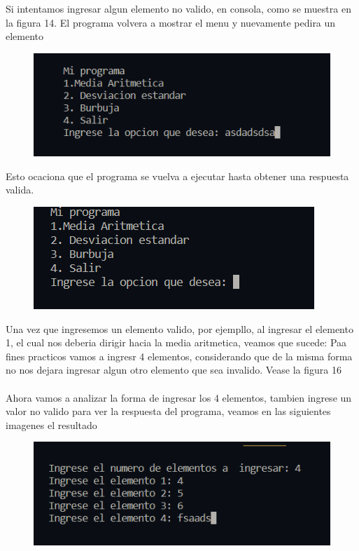 \documentclass[12pt]{article}
\begin{document}
Si intentamos ingresar algun elemento no valido, en consola, como se muestra en la figura 14. El programa volvera a mostrar el menu y  nuevamente pedira un elemento
	\begin{figure}[H]
		\begin{center}
 			\includegraphics[width = .6\textwidth]{ingresa_val_erroneo.png}
		\end{center} 
	\end{figure}
	Esto ocaciona que el programa se vuelva a ejecutar hasta obtener una respuesta valida. 
	\begin{figure}[H]
		\begin{center}
 			\includegraphics[width = .6\textwidth]{menu.png}
		\end{center} 
	\end{figure}
Una vez que ingresemos un elemento valido,  por ejempllo, al ingresar el elemento 1, el cual nos deberia dirigir hacia la media aritmetica, veamos que sucede: Paa fines practicos vamos a ingresr 4 elementos, considerando que de la misma forma no nos dejara ingresar algun otro elemento que sea invalido. Vease la figura 16
 \\
 \\
 Ahora vamos a analizar la forma de ingresar los 4 elementos, tambien ingrese un valor no valido para ver la respuesta del programa, veamos en las siguientes imagenes el resultado
	\begin{figure}[H]
		\begin{center}
 			\includegraphics[width = .6\textwidth]{4_elementos.png}
		\end{center} 
	\end{figure}
\end{document}

